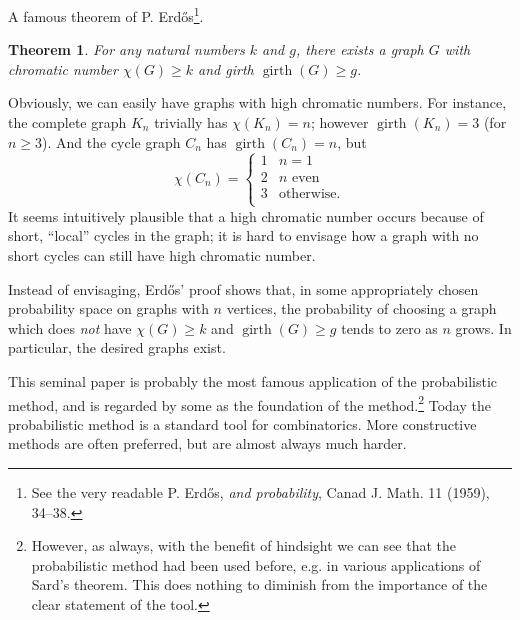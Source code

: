 \documentclass[12pt]{article}
\newtheorem{theorem}{Theorem}
\newcommand{\girth}{\operatorname{girth}}
\begin{document}
A famous theorem of P. Erd\H{o}s\footnote{See the very readable P. Erd\H{o}s, \textit{ and probability}, Canad J. Math. 11 (1959), 34--38.}.

\begin{theorem}
For any natural numbers $k$ and $g$, there exists a graph $G$ with chromatic number $\chi(G) \ge k$ and girth $\girth(G) \ge g$.
\end{theorem}

Obviously, we can easily have graphs with high chromatic numbers.  For instance, the complete graph $K_n$ trivially has $\chi(K_n)=n$; however $\girth(K_n)=3$ (for $n\ge 3$).  And the cycle graph $C_n$ has $\girth(C_n)=n$, but
$$
\chi(C_n)=
\begin{cases}
  1&n=1\\
  2&\text{$n$ even}\\
  3&\text{otherwise.}\\
\end{cases}
$$
It seems intuitively plausible that a high chromatic number occurs because of short, ``local'' cycles in the graph; it is hard to envisage how a graph with no short cycles can still have high chromatic number.

Instead of envisaging, Erd\H{o}s' proof shows that, in some appropriately chosen probability space on graphs with $n$ vertices, the probability of choosing a graph which does \emph{not} have $\chi(G)\ge k$ and $\girth(G)\ge g$ tends to zero as $n$ grows.  In particular, the desired graphs exist.

This seminal paper is probably the most famous application of the probabilistic method, and is regarded by some as the foundation of the method.\footnote{However, as always, with the benefit of hindsight we can see that the probabilistic method had been used before, e.g. in various applications of Sard's theorem.  This does nothing to diminish from the importance of the clear statement of the tool.}  Today the probabilistic method is a standard tool for combinatorics.  More constructive methods are often preferred, but are almost always much harder.
\end{document}
